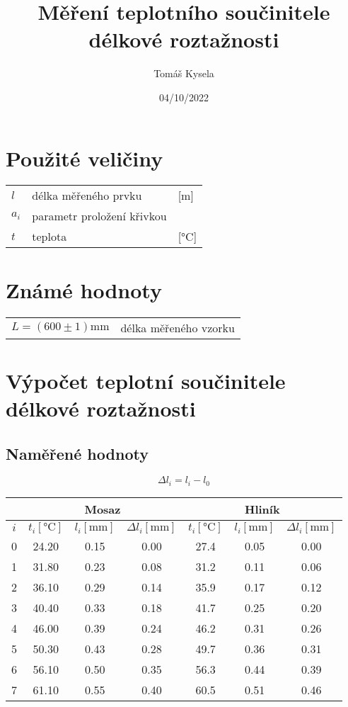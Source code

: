 \documentclass[a4paper,10pt]{article}
\title{Měření teplotního součinitele délkové roztažnosti}
\author{Tomáš Kysela}
\date{04/10/2022}
\begin{document}
\maketitle

\section{Použité veličiny}

\begin{tabular}{l l l}
 $l$ & délka měřeného prvku & [\si{\meter}]\\
 $a_i$ & parametr proložení křivkou & \\
 $t$ & teplota & [\si{\celsius}]
\end{tabular}

\section{Známé hodnoty}

\begin{tabular}{l l}
 $L = (600 \pm 1) \si{\milli\meter}$ & délka měřeného vzorku \\
\end{tabular}

\section{Výpočet teplotní součinitele délkové roztažnosti}
\subsection{Naměřené hodnoty}
\begin{equation}
 \Delta l_i = l_i-l_0
\end{equation}
\begin{table}[!ht]
    \centering
    \begin{tabular}{c||c|c|c||c|c|c}
         & \multicolumn{3}{c||}{Mosaz} & \multicolumn{3}{c}{Hliník}\\ \hline
        $i$ & $t_i [\si{\celsius}]$ & $l_i [\si{\milli\meter}]$ & $\Delta l_i [\si{\milli\meter}]$ & $t_i [\si{\celsius}]$ & $l_i [\si{\milli\meter}]$ & $\Delta l_i [\si{\milli\meter}]$\\ \hline\hline
        0 & 24.20 & 0.15 & 0.00 & 27.4 & 0.05 & 0.00\\ \hline
        1 & 31.80 & 0.23 & 0.08 & 31.2 & 0.11 & 0.06\\ \hline
        2 & 36.10 & 0.29 & 0.14 & 35.9 & 0.17 & 0.12\\ \hline
        3 & 40.40 & 0.33 & 0.18 & 41.7 & 0.25 & 0.20\\ \hline
        4 & 46.00 & 0.39 & 0.24 & 46.2 & 0.31 & 0.26\\ \hline
        5 & 50.30 & 0.43 & 0.28 & 49.7 & 0.36 & 0.31\\ \hline
        6 & 56.10 & 0.50 & 0.35 & 56.3 & 0.44 & 0.39\\ \hline
        7 & 61.10 & 0.55 & 0.40 & 60.5 & 0.51 & 0.46
    \end{tabular}
\end{table}
\end{document}
